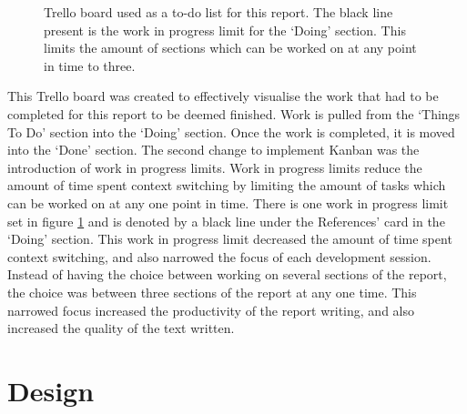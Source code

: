 \documentclass{article}
\begin{document}
\begin{figure}[H]
	\centering
	\caption{Trello board used as a to-do list for this report. The black line present is the work in progress limit for the `Doing' section. This limits the amount of sections which can be worked on at any point in time to three.}
	\label{figure:trelloBoardOG}
\end{figure}

This Trello board was created to effectively visualise the work that had to be completed for this report to be deemed finished. Work is pulled from the `Things To Do' section into the `Doing' section. Once the work is completed, it is moved into the `Done' section. The second change to implement Kanban was the introduction of work in progress limits. Work in progress limits reduce the amount of time spent context switching by limiting the amount of tasks which can be worked on at any one point in time. There is one work in progress limit set in figure \ref{figure:trelloBoardOG} and is denoted by a black line under the 	References' card in the `Doing' section. This work in progress limit decreased the amount of time spent context switching, and also narrowed the focus of each development session. Instead of having the choice between working on several sections of the report, the choice was between three sections of the report at any one time. This narrowed focus increased the productivity of the report writing, and also increased the quality of the text written. 

%
%
%

\section{Design}
\label{section:design}
\end{document}

